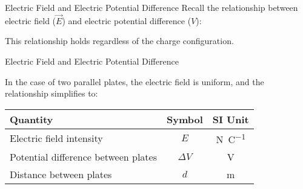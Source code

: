 \documentclass[12pt,aspectratio=169]{beamer}
\begin{document}
\begin{frame}{Electric Field and Electric Potential Difference}
  Recall the relationship between electric field ($\vec E$) and electric
  potential difference ($V$):
    
  
  This relationship holds regardless of the charge configuration.
\end{frame}




\begin{frame}{Electric Field and Electric Potential Difference}
  \begin{center}
  \end{center}
  In the case of two parallel plates, the electric field is uniform, and the
  relationship simplifies to:

  \begin{center}
    \begin{tabular}{l|c|c}
      \rowcolor{pink}
      \textbf{Quantity} & \textbf{Symbol} & \textbf{SI Unit} \\ \hline
      Electric field intensity & $E$ & \si{\newton\per\coulomb}\\
      Potential difference between plates & $\Delta V$ & \si\volt \\
      Distance between plates       & $d$ & \si\metre
    \end{tabular}
  \end{center}
\end{frame}
\end{document}
